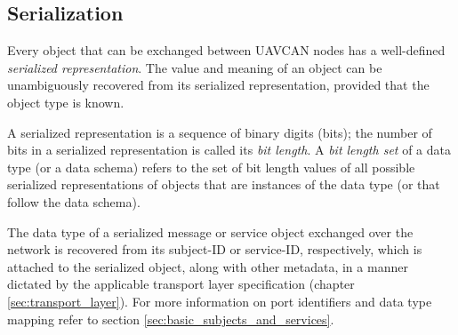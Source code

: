 \subsection{Serialization}

Every object that can be exchanged between UAVCAN nodes has a well-defined \emph{serialized representation}.
The value and meaning of an object can be unambiguously recovered from its serialized representation,
provided that the object type is known.

\label{sec:dsdl_bit_length_set}
A serialized representation is a sequence of binary digits (bits);
the number of bits in a serialized representation is called its \emph{bit length}.
A \emph{bit length set} of a data type (or a data schema) refers to the set of bit length values of all possible
serialized representations of objects that are instances of the data type (or that follow the data schema).

The data type of a serialized message or service object exchanged over the network
is recovered from its subject-ID or service-ID, respectively,
which is attached to the serialized object, along with other metadata, in a manner dictated by the applicable
transport layer specification (chapter \ref{sec:transport_layer}).
For more information on port identifiers and data type mapping refer to section \ref{sec:basic_subjects_and_services}.
